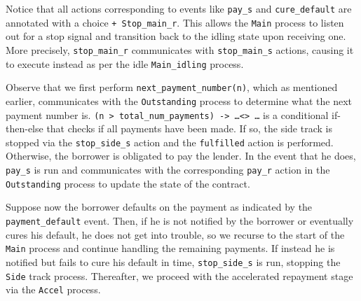 \documentclass{article}
\begin{document}
Notice that all actions corresponding to events like
\texttt{pay\_s} and \texttt{cure\_default} are annotated with a choice
\texttt{+ Stop\_main\_r}.
This allows the \texttt{Main} process to listen out for a stop signal and
transition back to the idling state upon receiving one.
More precisely, \texttt{stop\_main\_r} communicates with
\texttt{stop\_main\_s} actions, causing it to execute instead as per
the idle \texttt{Main\_idling} process. 


Observe that we first perform \texttt{next\_payment\_number(n)}, which as
mentioned earlier, communicates with the \texttt{Outstanding} process to
determine what the next payment number is.
\texttt{(n > total\_num\_payments) -> \dots <> \dots} is a conditional
if-then-else that checks if all payments have been made.
If so, the side track is stopped via the \texttt{stop\_side\_s} action and
the \texttt{fulfilled} action is performed.
Otherwise, the borrower is obligated to pay the lender.
In the event that he does, \texttt{pay\_s} is run and communicates with the
corresponding \texttt{pay\_r} action in the \texttt{Outstanding} process to
update the state of the contract.

Suppose now the borrower defaults on the payment as indicated by the
\texttt{payment\_default} event. 
Then, if he is not notified by the borrower or eventually cures his default,
he does not get into trouble, so we recurse to the start of the \texttt{Main}
process and continue handling the remaining payments.
If instead he is notified but fails to cure his default in time,
\texttt{stop\_side\_s} is run, stopping the \texttt{Side} track process.
Thereafter, we proceed with the accelerated repayment stage via the
\texttt{Accel} process.


\end{document}
